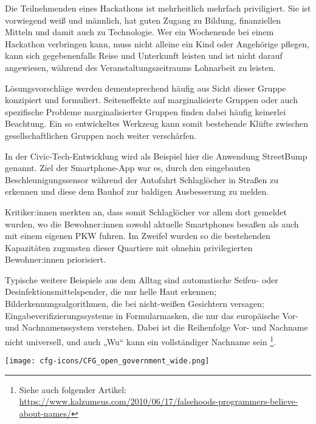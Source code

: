 Die Teilnehmenden eines Hackathons ist mehrheitlich mehrfach priviligiert. Sie ist vorwiegend weiß und männlich, hat guten Zugang zu Bildung, finanziellen Mitteln und damit auch zu Technologie. Wer ein Wochenende bei einem Hackathon verbringen kann, muss nicht alleine ein Kind oder Angehörige pflegen, kann sich gegebenenfalls Reise und Unterkunft leisten und ist nicht darauf angewiesen, während des Veranstaltungszeitraums Lohnarbeit zu leisten. 

Lösungsvorschläge werden dementsprechend häufig aus Sicht dieser Gruppe konzipiert und formuliert. Seiteneffekte auf marginalisierte Gruppen oder auch spezifische Probleme marginalisierter Gruppen finden dabei häufig keinerlei Beachtung. Ein so entwickeltes Werkzeug kann somit bestehende Klüfte zwischen gesellschaftlichen Gruppen noch weiter verschärfen.

\begin{kaobox}
	In der Civic-Tech-Entwicklung wird als Beispiel hier die Anwendung StreetBump genannt. Ziel der Smartphone-App war es, durch den eingebauten Beschleunigungssensor während der Autofahrt Schlaglöcher in Straßen zu erkennen und diese dem Bauhof zur baldigen Ausbesserung zu melden. 
	
	Kritiker:innen merkten an, dass somit Schlaglöcher vor allem dort gemeldet wurden, wo die Bewohner:innen sowohl aktuelle Smartphones besaßen als auch mit einem eigenen PKW fuhren. Im Zweifel wurden so die bestehenden Kapazitäten zugunsten dieser Quartiere mit ohnehin privilegierten Bewohner:innen priorisiert.
	
	Typische weitere Beispiele aus dem Alltag sind automatische Seifen- oder Desinfektionsmittelspender, die nur helle Haut erkennen; Bilderkennungsalgorithmen, die bei nicht-weißen Gesichtern versagen; Eingabeverifizierungssysteme in Formularmasken, die nur das europäische Vor- und Nachnamenssystem verstehen. Dabei ist die Reihenfolge Vor- und Nachname nicht universell, und auch „Wu“ kann ein vollständiger Nachname sein \footnote{Siehe auch folgender Artikel: \url{https://www.kalzumeus.com/2010/06/17/falsehoods-programmers-believe-about-names/}}.
\end{kaobox}


\vspace{0cm}
\begin{figure*}[h!]
	\texttt{[image: cfg-icons/CFG\_open\_government\_wide.png]}
\end{figure*}

